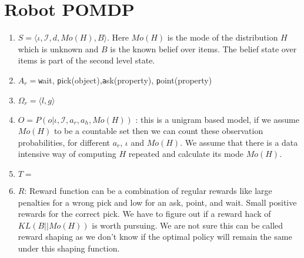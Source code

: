 \documentclass{article}
\newcommand{\myitem}{\stepcounter{enumi}\item[$*$\theenumi.]}
\begin{document}
\section{Robot POMDP}
\begin{enumerate}


\item $S = \langle \iota, \mathcal{I}, d, Mo(H), B \rangle$.
Here $Mo(H)$ is the mode of the distribution $H$ which is unknown and $B$ is the known belief over items. The belief state over items is part of the second level state.
\item $A_r = ${{\texttt wait}, {\texttt pick(object)},{\texttt  ask(property)}, {\texttt  point(property)}}
\item $\Omega_r = \langle l,g \rangle$
\myitem $O = P(o | \iota, \mathcal{I}, a_r, a_h, Mo(H))$ : this is a unigram based model, if we assume $Mo(H)$ to be a countable set then we can count these observation probabilities, for different $a_r$, $\iota$ and $Mo(H)$. We assume that there is a data intensive way of computing $H$ repeated and calculate its mode $Mo(H)$.
\item $T = $
\item $R$: Reward function can be a combination of regular rewards like large penalties for a wrong pick and low for an ask, point, and wait. Small positive rewards for the correct pick. We have to figure out if a reward hack of $KL(B||Mo(H))$ is worth pursuing. We are not sure this can be called reward shaping as we don't know if the optimal policy will remain the same under this shaping function. 


\end{enumerate}
\end{document}
